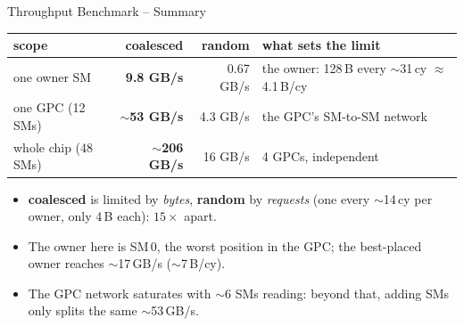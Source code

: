 \documentclass[aspectratio=169, numbering=fraction]{beamer}
\begin{document}
\begin{frame}{Throughput Benchmark -- Summary}
  \footnotesize

  \vspace{2em}
  \centering
  \begin{tabular}{lrrl}
    \toprule
    scope & \textbf{coalesced} & random & what sets the limit \\
    \midrule
    one owner SM & \textbf{9.8 GB/s} & 0.67 GB/s & the owner: 128\,B every $\sim$31\,cy $\approx$ 4.1\,B/cy \\
    one GPC (12 SMs) & \textbf{$\sim$53 GB/s} & 4.3 GB/s & the GPC's SM-to-SM network \\
    whole chip (48 SMs) & \textbf{$\sim$206 GB/s} & 16 GB/s & 4 GPCs, independent \\
    \bottomrule
  \end{tabular}
  \vspace{0.8em}
  \raggedright
  \begin{itemize}\itemsep2pt
    \item \textbf{coalesced} is limited by \emph{bytes}, \textbf{random} by \emph{requests}
          (one every $\sim$14\,cy per owner, only 4\,B each): $15\times$ apart.
    \item The owner here is SM\,0, the worst position in the GPC; the best-placed
          owner reaches $\sim$17\,GB/s ($\sim$7\,B/cy).
    \item The GPC network saturates with $\sim$6 SMs reading: beyond that, adding SMs
          only splits the same $\sim$53\,GB/s.
  \end{itemize}
\end{frame}
\end{document}
